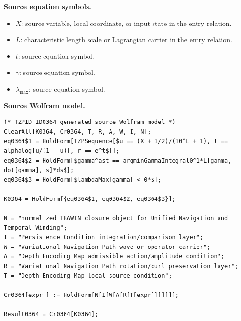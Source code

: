 \begin{minipage}[t]{0.49\linewidth}
\begingroup
\small
\raggedright
\textbf{Source equation symbols.}\par
\begin{itemize}[leftmargin=1.35em,itemsep=1pt,topsep=1pt,parsep=0pt]
    \item $X$: source variable, local coordinate, or input state in the entry relation.
    \item $L$: characteristic length scale or Lagrangian carrier in the entry relation.
    \item $t$: source equation symbol.
    \item $\gamma$: source equation symbol.
    \item $\lambda_{\max}$: source equation symbol.
\end{itemize}
\endgroup
\end{minipage}\hfill
\begin{minipage}[t]{0.47\linewidth}
\begingroup
\scriptsize
\raggedright
\textbf{Source Wolfram model.}\par
\begin{Verbatim}[fontsize=\tiny,breaklines=true,breakanywhere=true]
(* TZPID ID0364 generated source Wolfram model *)
ClearAll[K0364, Cr0364, T, R, A, W, I, N];
eq0364$1 = HoldForm[TZPSequence[$u == (X + 1/2)/(10^L + 1), t == alphalog[u/(1 - u)], r == e^t$]];
eq0364$2 = HoldForm[$gamma^ast == argminGammaIntegral0^1*L[gamma, dot[gamma], s]*ds$];
eq0364$3 = HoldForm[$lambdaMax[gamma] < 0*$];

K0364 = HoldForm[{eq0364$1, eq0364$2, eq0364$3}];

N = "normalized TRAWIN closure object for Unified Navigation and Temporal Winding";
I = "Persistence Condition integration/comparison layer";
W = "Variational Navigation Path wave or operator carrier";
A = "Depth Encoding Map admissible action/amplitude condition";
R = "Variational Navigation Path rotation/curl preservation layer";
T = "Depth Encoding Map local source condition";

Cr0364[expr_] := HoldForm[N[I[W[A[R[T[expr]]]]]]];

Result0364 = Cr0364[K0364];
\end{Verbatim}
\endgroup
\end{minipage}

